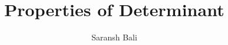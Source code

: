 \documentclass[journal,12pt,twocolumn]{IEEEtran}
\begin{document}
\makeatletter
{}
\makeatother
\let\StandardTheFigure\thefigure
\let\vec\mathbf
\renewcommand{\thefigure}{\theproblem}
\def\putbox#1#2#3{\makebox[0in][l]{\makebox[#1][l]{}\raisebox{\baselineskip}[0in][0in]{\raisebox{#2}[0in][0in]{#3}}}}
     \def\rightbox#1{\makebox[0in][r]{#1}}
     \def\centbox#1{\makebox[0in]{#1}}
     \def\topbox#1{\raisebox{-\baselineskip}[0in][0in]{#1}}
     \def\midbox#1{\raisebox{-0.5\baselineskip}[0in][0in]{#1}}
\vspace{3cm}
\title{Properties of Determinant}
\author{Saransh Bali}
%
%
%
% 
%
\end{document}
